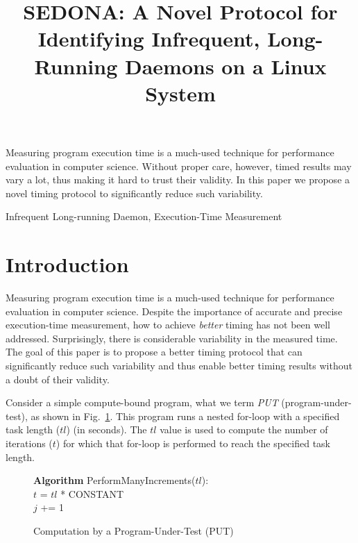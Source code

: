 \documentclass[letter]{ieice}
\title{SEDONA: A Novel Protocol for Identifying Infrequent, Long-Running Daemons on a Linux System}
\begin{document}
\maketitle

\begin{summary}
{\color{blue}
Measuring program execution time is 
a \hbox{much-used} technique for performance evaluation in computer science. 
Without proper care, however, timed results may vary a lot, 
thus making it hard to trust their validity. 
In this paper we propose a novel timing protocol to significantly 
reduce such variability.
}

\end{summary}
\begin{keywords}
Infrequent Long-running Daemon, Execution-Time Measurement
\end{keywords}

\section{Introduction}
\label{sec:intro}

Measuring program execution time is a much-used
technique for performance evaluation in computer science. 
Despite the importance of accurate and precise execution-time measurement, 
how to achieve {\em better} timing has not been well addressed. 
Surprisingly, there is considerable variability in the measured time.
{\color{blue}
The goal of this paper is to propose
a better timing protocol that can significantly reduce such variability 
and thus enable better timing results without a doubt of their validity.
}

Consider a simple compute-bound program, what we term {\em PUT} (program-under-test), 
as shown in Fig.~\ref{alg:put}. 
This program runs a nested for-loop with a specified task length ($tl$) (in seconds). 
{\color{blue}
The $tl$ value is used to compute 
the number of iterations ($t$) for which that for-loop is performed 
to reach the specified task length.}

\vspace{-.2in}
\begin{figure}[h]
\begin{center}
\begin{algorithmic}
{\bf Algorithm} PerformManyIncrements($tl$): \\
\STATE $t$ = $tl$ * {CONSTANT} \\
		\STATE $j$ += 1 \\
	\ENDFOR 
\ENDFOR 
\end{algorithmic}
\end{center}
\caption{Computation by a Program-Under-Test (PUT)\label{alg:put}}
\vspace{-.2in}
\end{figure}
\end{document}
